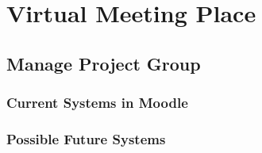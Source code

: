 \section{Virtual Meeting Place}
\label{sec:projectgroups}


\subsection{Manage Project Group}
\subsubsection{Current Systems in Moodle}
\subsubsection{Possible Future Systems}





\begin{comment}
\todo{Undersøgelse af: "`Hvem skal oprette projektgrupperne"' }
\todo{Kom frem til at vi skal interview administrativt personale for at finde ud af hvordan grupper bliver brugt i praksis}
\subsection{Interviews}
\todo{Fortæl om følgende interviews
-Thomas Rybjerg
-Lene Even
-Jette og Pia
-Morten Andersen
-Mikael Møller} 
\end{comment}
